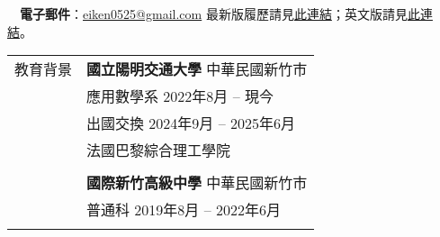 \documentclass[letterpaper, 11pt]{article}
\begin{document}
\begin{CJK*}{UTF8}{bsmi}


\vspace{0.5cm} 
\noindent\:\ \ \:\!\:\!\textbf{電子郵件}：\href{mailto:eiken0525@gmail.com}{eiken0525@gmail.com} \hfill{\footnotesize 最新版履歷請見\href{https://github.com/eiken59/CV/blob/main/eiken59_CV_chinese.pdf}{此連結}；英文版請見\href{https://github.com/eiken59/CV/blob/main/eiken59_CV.pdf}{此連結}。\ \ \ \,}


\setlength{\tabcolsep}{8pt}
\vspace{-1.5em}
\begin{center}
    \begin{longtable}{p{0.72in}p{5.97in}}

        
        
        
        \textcolor{OliveGreen}{教育背景} 
        & \textbf{國立陽明交通大學} \hfill 中華民國新竹市 \\ 
        & 應用數學系 \hfill 2022年8月 -- 現今 \\
        & 出國交換 \hfill 2024年9月 -- 2025年6月\\
        & \qquad 法國巴黎綜合理工學院 \\
        & \\
        
        & \textbf{國際新竹高級中學} \hfill 中華民國新竹市 \\
        & 普通科 \hfill 2019年8月 -- 2022年6月\\
        & \\
        
        

\end{longtable}
\end{center}
\end{CJK*}
\end{document}
